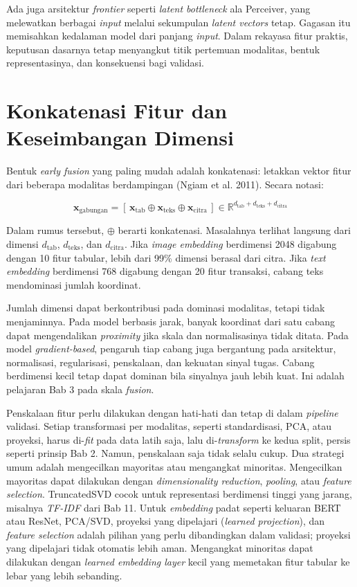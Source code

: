 Ada juga arsitektur \emph{frontier} seperti \emph{latent bottleneck} ala Perceiver, yang melewatkan berbagai \emph{input} melalui sekumpulan \emph{latent vectors} tetap. Gagasan itu memisahkan kedalaman model dari panjang \emph{input}. Dalam rekayasa fitur praktis, keputusan dasarnya tetap menyangkut titik pertemuan modalitas, bentuk representasinya, dan konsekuensi bagi validasi.

\section{Konkatenasi Fitur dan Keseimbangan Dimensi}\label{konkatenasi-fitur-dan-keseimbangan-dimensi}

Bentuk \emph{early fusion} yang paling mudah adalah konkatenasi: letakkan vektor fitur dari beberapa modalitas berdampingan (Ngiam et al. 2011). Secara notasi:

\[
\mathbf{x}_{\text{gabungan}} = [\, \mathbf{x}_{\text{tab}} \oplus \mathbf{x}_{\text{teks}} \oplus \mathbf{x}_{\text{citra}} \,] \in \mathbb{R}^{d_{\text{tab}} + d_{\text{teks}} + d_{\text{citra}}}
\]

Dalam rumus tersebut, \(\oplus\) berarti konkatenasi. Masalahnya terlihat langsung dari dimensi \(d_{\text{tab}}\), \(d_{\text{teks}}\), dan \(d_{\text{citra}}\). Jika \emph{image embedding} berdimensi 2048 digabung dengan 10 fitur tabular, lebih dari 99\% dimensi berasal dari citra. Jika \emph{text embedding} berdimensi 768 digabung dengan 20 fitur transaksi, cabang teks mendominasi jumlah koordinat.

Jumlah dimensi dapat berkontribusi pada dominasi modalitas, tetapi tidak menjaminnya. Pada model berbasis jarak, banyak koordinat dari satu cabang dapat mengendalikan \emph{proximity} jika skala dan normalisasinya tidak ditata. Pada model \emph{gradient-based}, pengaruh tiap cabang juga bergantung pada arsitektur, normalisasi, regularisasi, penskalaan, dan kekuatan sinyal tugas. Cabang berdimensi kecil tetap dapat dominan bila sinyalnya jauh lebih kuat. Ini adalah pelajaran Bab 3 pada skala \emph{fusion}.

Penskalaan fitur perlu dilakukan dengan hati-hati dan tetap di dalam \emph{pipeline} validasi. Setiap transformasi per modalitas, seperti standardisasi, PCA, atau proyeksi, harus di-\emph{fit} pada data latih saja, lalu di-\emph{transform} ke kedua split, persis seperti prinsip Bab 2. Namun, penskalaan saja tidak selalu cukup. Dua strategi umum adalah mengecilkan mayoritas atau mengangkat minoritas. Mengecilkan mayoritas dapat dilakukan dengan \emph{dimensionality reduction}, \emph{pooling}, atau \emph{feature selection}. TruncatedSVD cocok untuk representasi berdimensi tinggi yang jarang, misalnya \emph{TF-IDF} dari Bab 11. Untuk \emph{embedding} padat seperti keluaran BERT atau ResNet, PCA/SVD, proyeksi yang dipelajari (\emph{learned projection}), dan \emph{feature selection} adalah pilihan yang perlu dibandingkan dalam validasi; proyeksi yang dipelajari tidak otomatis lebih aman. Mengangkat minoritas dapat dilakukan dengan \emph{learned embedding layer} kecil yang memetakan fitur tabular ke lebar yang lebih sebanding.

